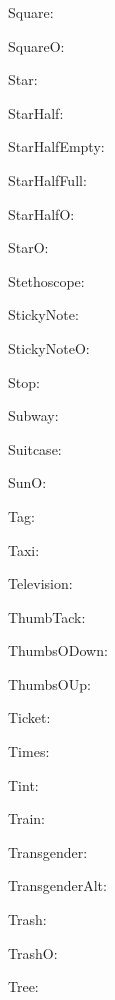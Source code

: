 \documentclass{article}
\begin{document}
      Square: \faSquare\ 

      SquareO: \faSquareO\ 

      Star: \faStar\ 

      StarHalf: \faStarHalf\ 

      StarHalfEmpty: \faStarHalfEmpty\ 

      StarHalfFull: \faStarHalfFull\ 

      StarHalfO: \faStarHalfO\ 

      StarO: \faStarO\ 

      Stethoscope: \faStethoscope\ 

      StickyNote: \faStickyNote\ 

      StickyNoteO: \faStickyNoteO\ 

      Stop: \faStop\ 

      Subway: \faSubway\ 

      Suitcase: \faSuitcase\ 

      SunO: \faSunO\ 

      Tag: \faTag\ 

      Taxi: \faTaxi\ 

      Television: \faTelevision\ 

      ThumbTack: \faThumbTack\ 

      ThumbsODown: \faThumbsODown\ 

      ThumbsOUp: \faThumbsOUp\ 

      Ticket: \faTicket\ 

      Times: \faTimes\ 

      Tint: \faTint\ 

      Train: \faTrain\ 

      Transgender: \faTransgender\ 

      TransgenderAlt: \faTransgenderAlt\ 

      Trash: \faTrash\ 

      TrashO: \faTrashO\ 

      Tree: \faTree\ 
\end{document}
